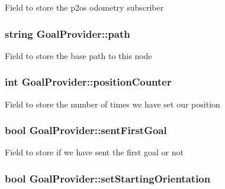 \-Field to store the p2os odometry subscriber \hypertarget{classGoalProvider_a82146db14a5565a12fe979c68156d45c}{
\subsubsection[{path}]{\setlength{\rightskip}{0pt plus 5cm}string {\bf \-Goal\-Provider\-::path}}}\label{classGoalProvider_a82146db14a5565a12fe979c68156d45c}
\-Field to store the base path to this node \hypertarget{classGoalProvider_a9f314d13331aa611c5b96202742be0e9}{
\subsubsection[{position\-Counter}]{\setlength{\rightskip}{0pt plus 5cm}int {\bf \-Goal\-Provider\-::position\-Counter}}}\label{classGoalProvider_a9f314d13331aa611c5b96202742be0e9}
\-Field to store the number of times we have set our position \hypertarget{classGoalProvider_aa576e5466ea93048ed6c231f226c9658}{
\subsubsection[{sent\-First\-Goal}]{\setlength{\rightskip}{0pt plus 5cm}bool {\bf \-Goal\-Provider\-::sent\-First\-Goal}}}\label{classGoalProvider_aa576e5466ea93048ed6c231f226c9658}
\-Field to store if we have sent the first goal or not \hypertarget{classGoalProvider_a94c6c903648ec2ff61396d04686bc466}{
\subsubsection[{set\-Starting\-Orientation}]{\setlength{\rightskip}{0pt plus 5cm}bool {\bf \-Goal\-Provider\-::set\-Starting\-Orientation}}}\label{classGoalProvider_a94c6c903648ec2ff61396d04686bc466}
